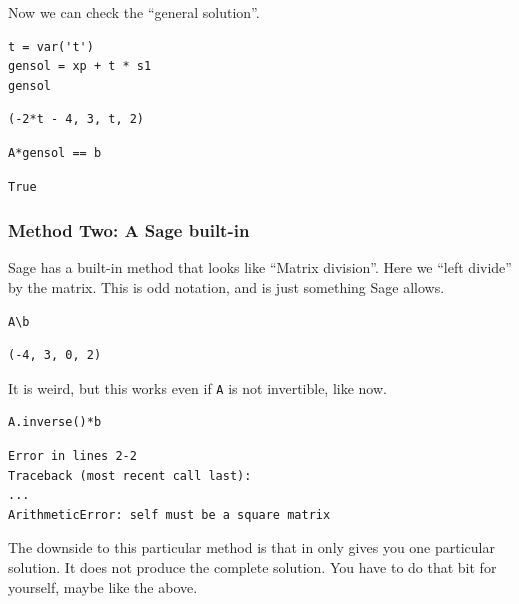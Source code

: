 \documentclass[10pt,]{book}
\theoremstyle{plain}
\theoremstyle{definition}
\numberwithin{equation}{section}
\begin{document}
        Now we can check the ``general solution''.
\begin{lstlisting}[style=sageinput]
t = var('t')
gensol = xp + t * s1
gensol
\end{lstlisting}
\begin{lstlisting}[style=sageoutput]
(-2*t - 4, 3, t, 2)
\end{lstlisting}
\begin{lstlisting}[style=sageinput]
A*gensol == b
\end{lstlisting}
\begin{lstlisting}[style=sageoutput]
True
\end{lstlisting}
\typeout{************************************************}
\typeout{************************************************}
\subsubsection[Method Two: A Sage built-in]{Method Two: A Sage built-in}\label{subsubsection-37}

        Sage has a built-in method that looks like ``Matrix division''. Here
        we ``left divide'' by the matrix. This is odd notation, and is just
        something Sage allows.
\begin{lstlisting}[style=sageinput]
A\b
\end{lstlisting}
\begin{lstlisting}[style=sageoutput]
(-4, 3, 0, 2)
\end{lstlisting}
\par

        It is weird, but this works even if \verb?A? is not invertible, like now.
\begin{lstlisting}[style=sageinput]
A.inverse()*b
\end{lstlisting}
\begin{lstlisting}[style=sageoutput]
Error in lines 2-2
Traceback (most recent call last):
...
ArithmeticError: self must be a square matrix
\end{lstlisting}
\par

        The downside to this particular method is that in only gives you one
        particular solution. It does not produce the complete solution. You have
        to do that bit for yourself, maybe like the above.
\typeout{************************************************}
\typeout{************************************************}
\end{document}
